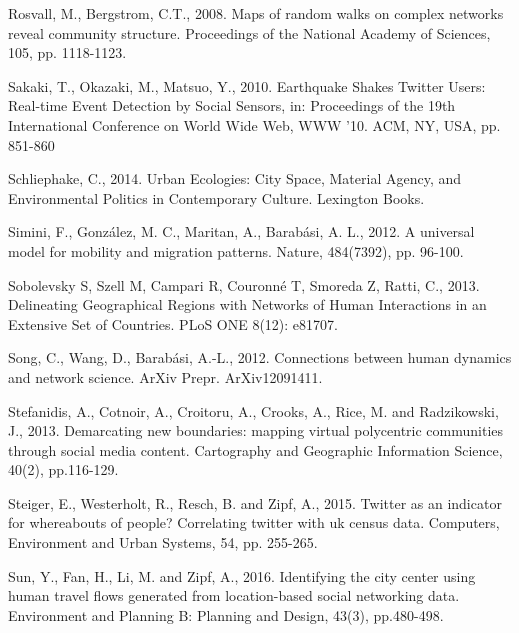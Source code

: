 \documentclass[]{tGIS2e}
\begin{document}
\begin{thebibliography}{9}
Rosvall, M., Bergstrom, C.T., 2008. Maps of random walks on complex networks reveal community structure. Proceedings of the National Academy of Sciences, 105, pp. 1118-1123.

Sakaki, T., Okazaki, M., Matsuo, Y., 2010. Earthquake Shakes Twitter Users: Real-time Event Detection by Social Sensors, in: Proceedings of the 19th International Conference on World Wide Web, WWW ’10. ACM, NY, USA, pp. 851-860

Schliephake, C., 2014. Urban Ecologies: City Space, Material Agency, and Environmental Politics in Contemporary Culture. Lexington Books.

Simini, F., González, M. C., Maritan, A., Barabási, A. L., 2012. A universal model for mobility and migration patterns. Nature, 484(7392), pp. 96-100.

Sobolevsky S, Szell M, Campari R, Couronné T, Smoreda Z, Ratti, C., 2013. Delineating Geographical Regions with Networks of Human Interactions in an Extensive Set of Countries. PLoS ONE 8(12): e81707.

Song, C., Wang, D., Barabási, A.-L., 2012. Connections between human dynamics and network science. ArXiv Prepr. ArXiv12091411.

Stefanidis, A., Cotnoir, A., Croitoru, A., Crooks, A., Rice, M. and Radzikowski, J., 2013. Demarcating new boundaries: mapping virtual polycentric communities through social media content. Cartography and Geographic Information Science, 40(2), pp.116-129.

Steiger, E., Westerholt, R., Resch, B. and Zipf, A., 2015. Twitter as an indicator for whereabouts of people? Correlating twitter with uk census data. Computers, Environment and Urban Systems, 54, pp. 255-265.

Sun, Y., Fan, H., Li, M. and Zipf, A., 2016. Identifying the city center using human travel flows generated from location-based social networking data. Environment and Planning B: Planning and Design, 43(3), pp.480-498.


\end{thebibliography}
\end{document}
